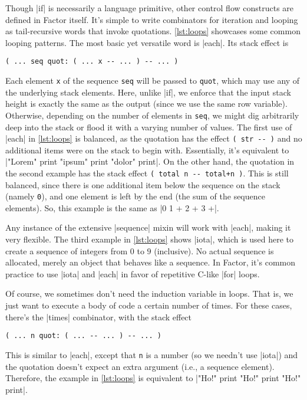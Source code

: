
Though \factor|if| is necessarily a language primitive, other control flow
constructs are defined in Factor itself.  It's simple to write combinators for
iteration and looping as tail-recursive words that invoke quotations.
\cref{lst:loops} showcases some common looping patterns.  The most basic yet
versatile word is \factor|each|.  Its stack effect is
%
\begin{center}
%
  \Verb|( ... seq quot: ( ... x -- ... ) -- ... )|
%
\end{center}
%
\noindent Each element \Verb|x| of the sequence \Verb|seq| will be passed
to \Verb|quot|, which may use any of the underlying stack elements.  Here,
unlike \factor|if|, we enforce that the input stack height is exactly the same
as the output (since we use the same row variable).  Otherwise, depending on
the number of elements in \Verb|seq|, we might dig arbitrarily deep into the
stack or flood it with a varying number of values.  The first use of
\factor|each| in \cref{lst:loops} is balanced, as the quotation has the effect
%
\Verb|( str -- )|
%
and no additional items were on the stack to begin with.  Essentially, it's
equivalent to
%
\factor|"Lorem" print "ipsum" print "dolor" print|.
%
On the other hand, the quotation in the second example has the stack effect
%
\Verb|( total n -- total+n )|.
%
This is still balanced, since there is one additional item below the sequence
on the stack (namely \Verb|0|), and one element is left by the end (the sum
of the sequence elements).  So, this example is the same as
%
\factor|0 1 + 2 + 3 +|.

Any instance of the extensive \factor|sequence| mixin will work with
\factor|each|, making it very flexible.  The third example in \cref{lst:loops}
shows \factor|iota|, which is used here to create a  sequence of
integers from $0$ to $9$ (inclusive).  No actual sequence is allocated, merely
an object that behaves like a sequence.  In Factor, it's common practice to use
\factor|iota| and \factor|each| in favor of repetitive C-like |for|
loops.

Of course, we sometimes don't need the induction variable in loops.  That is,
we just want to execute a body of code a certain number of times.  For these
cases, there's the \factor|times| combinator, with the stack effect
%
\begin{center}
%
  \Verb|( ... n quot: ( ... -- ... ) -- ... )|
%
\end{center}
%
\noindent This is similar to \factor|each|, except that \Verb|n| is a number
(so we needn't use \factor|iota|) and the quotation doesn't expect an extra
argument (i.e., a sequence element).  Therefore, the example in
\cref{lst:loops} is equivalent to
%
\factor|"Ho!" print "Ho!" print "Ho!" print|.
%

